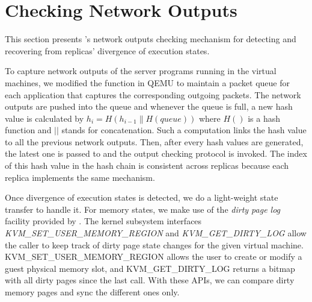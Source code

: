 \section{Checking Network Outputs} \label{sec:output}

This section presents \xxx's network outputs checking mechanism for 
detecting and recovering from replicas' divergence of execution states.

To capture network outputs of the server programs running in the virtual machines, we 
modified the \taprecv function in QEMU to maintain a packet queue for each application 
that captures the corresponding outgoing packets. The network outputs are pushed into the 
queue and whenever the queue is full, a new hash value is calculated by 
$h_i=H(h_{i-1}\|H(queue))$ where $H()$ is a hash function and $||$ stands for concatenation. 
Such a computation links the hash value to all the previous network outputs. Then, after 
every \thashcomp hash values are generated, the latest one is passed to \smrsystem and 
the output checking protocol is invoked. The index of this hash value in the hash chain is 
consistent across replicas because each replica implements the same mechanism. 


Once divergence of execution states is detected, we do a light-weight state transfer to 
handle it. For memory states, we make use of the \emph{dirty page log} facility provided 
by \kvm. The \kvm kernel subsystem interfaces \emph{KVM\_SET\_USER\_MEMORY\_REGION} and 
\emph{KVM\_GET\_DIRTY\_LOG} allow the caller to keep track of dirty page state changes 
for the given virtual machine. KVM\_SET\_USER\_MEMORY\_REGION allows the user to create or 
modify a guest physical memory slot, and KVM\_GET\_DIRTY\_LOG returns a bitmap with all 
dirty pages since the last call. With these APIs, we can compare dirty memory pages and 
sync the different ones only.